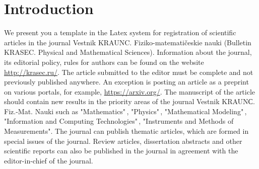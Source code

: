 \documentclass{mfitjournal-en}%
\begin{document}

\normalsize

\section*{Introduction}


We present you a template in the Latex system for registration of scientific articles in the journal Vestnik KRAUNC. Fiziko-matemati\v{c}eskie nauki (Bulletin KRASEC. Physical and Mathematical Sciences). Information about the journal, its editorial policy, rules for authors can be found on the website \href{http://krasec.ru/} {http://krasec.ru/}. The article submitted to the editor must be complete and not previously published anywhere. An exception is posting an article as a preprint on various portals, for example, \href{https://arxiv.org/}{https://arxiv.org/}. The manuscript of the article should contain new results in the priority areas of the journal Vestnik KRAUNС. Fiz.-Mat. Nauki such as "Mathematics"\,, "Physics"\,, "Mathematical Modeling"\,, "Information and Computing Technologies"\,, "Instruments and Methods of Measurements". The journal can publish thematic articles, which are formed in special issues of the journal. Review articles, dissertation abstracts and other scientific reports can also be published in the journal in agreement with the editor-in-chief of the journal.

\end{document}
